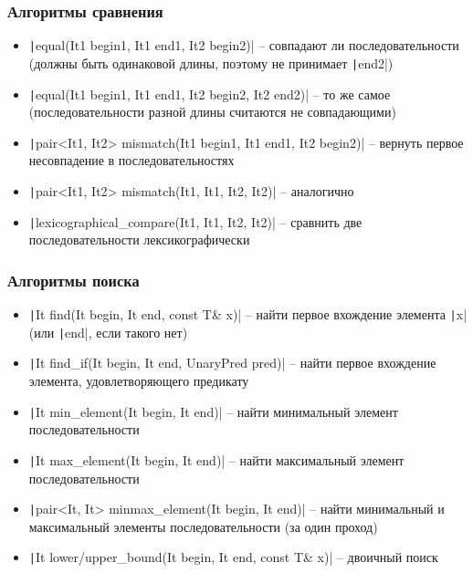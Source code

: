 \documentclass[10pt]{beamer}
\begin{document}
\begin{frame}[fragile]
\frametitle{Алгоритмы сравнения}
\begin{itemize}
\item \texttt|equal(It1 begin1, It1 end1, It2 begin2)| -- совпадают ли последовательности (должны быть одинаковой длины, поэтому не принимает \texttt|end2|)
\pause
\item \texttt|equal(It1 begin1, It1 end1, It2 begin2, It2 end2)| -- то же самое (последовательности разной длины считаются не совпадающими)
\pause
\item \texttt|pair<It1, It2> mismatch(It1 begin1, It1 end1, It2 begin2)| -- вернуть первое несовпадение в последовательностях
\pause
\item \texttt|pair<It1, It2> mismatch(It1, It1, It2, It2)| -- аналогично
\pause
\item \texttt|lexicographical_compare(It1, It1, It2, It2)| -- сравнить две последовательности лексикографически
\end{itemize}
\end{frame}

\begin{frame}[fragile]
\frametitle{Алгоритмы поиска}
\begin{itemize}
\item \texttt|It find(It begin, It end, const T& x)| -- найти первое вхождение элемента \texttt|x| (или \texttt|end|, если такого нет)
\pause
\item \texttt|It find_if(It begin, It end, UnaryPred pred)| -- найти первое вхождение элемента, удовлетворяющего предикату
\pause
\item \texttt|It min_element(It begin, It end)| -- найти минимальный элемент последовательности
\pause
\item \texttt|It max_element(It begin, It end)| -- найти максимальный элемент последовательности
\pause
\item \texttt|pair<It, It> minmax_element(It begin, It end)| -- найти минимальный и максимальный элементы последовательности (за один проход)
\pause
\item \texttt|It lower/upper_bound(It begin, It end, const T& x)| -- двоичный поиск
\end{itemize}
\end{frame}
\end{document}
